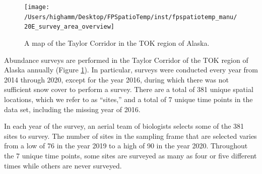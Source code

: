 \documentclass[]{interact}
\theoremstyle{plain}%
\theoremstyle{definition}
\theoremstyle{remark}
\begin{document}
\begin{figure}
\texttt{[image: /Users/highamm/Desktop/FPSpatioTemp/inst/fpspatiotemp\_manu/20E\_survey\_area\_overview]} \caption{\label{fig:tokplot} A map of the Taylor Corridor in the TOK region of Alaska.}\label{fig:tokplot}
\end{figure}

Abundance surveys are performed in the Taylor Corridor of the TOK region
of Alaska annually (Figure \ref{fig:tokplot}). In particular, surveys
were conducted every year from 2014 through 2020, except for the year
2016, during which there was not sufficient snow cover to perform a
survey. There are a total of 381 unique spatial locations, which we
refer to as ``sites,'' and a total of 7 unique time points in the data
set, including the missing year of 2016.

In each year of the survey, an aerial team of biologists selects some of
the 381 sites to survey. The number of sites in the sampling frame that
are selected varies from a low of 76 in the year 2019 to a high of 90 in
the year 2020. Throughout the 7 unique time points, some sites are
surveyed as many as four or five different times while others are never
surveyed.
\end{document}
